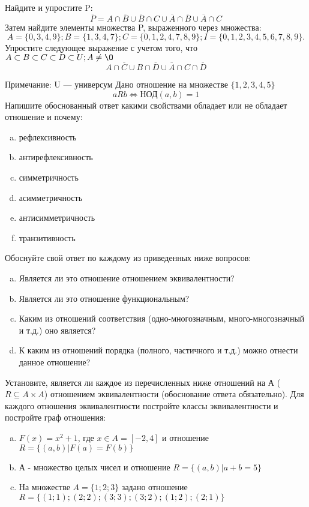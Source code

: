 \documentclass[10pt]{exam}
\begin{document}
\begin{questions}
\question
Найдите и упростите P:
\begin{equation*}
\overline{P} = A \cap \overline{B} \cup \overline{B} \cap C \cup \overline{A} \cap \overline{B} \cup \overline{A} \cap C
\end{equation*}
Затем найдите элементы множества P, выраженного через множества:
\begin{equation*}
A = \{0, 3, 4, 9\}; 
B = \{1, 3, 4, 7\};
C = \{0, 1, 2, 4, 7, 8, 9\};
I = \{0, 1, 2, 3, 4, 5, 6, 7, 8, 9\}.
\end{equation*}\question
Упростите следующее выражение с учетом того, что $A\subset B \subset C \subset D \subset U; A \neq \O$
\begin{equation*}
A \cap  \overline{C} \cup B \cap \overline{D} \cup  \overline{A} \cap C \cap  \overline{D}
\end{equation*}

Примечание: U — универсум\question
Дано отношение на множестве $\{1, 2, 3, 4, 5\}$ 
\begin{equation*}
aRb \iff  \text{НОД}(a,b) =1
\end{equation*}
Напишите обоснованный ответ какими свойствами обладает или не обладает отношение и почему:   
\begin{enumerate} [a)]\setcounter{enumi}{0}
\item рефлексивность
\item антирефлексивность
\item симметричность
\item асимметричность
\item антисимметричность
\item транзитивность
\end{enumerate}

Обоснуйте свой ответ по каждому из приведенных ниже вопросов:
\begin{enumerate} [a)]\setcounter{enumi}{0}
    \item Является ли это отношение отношением эквивалентности?
    \item Является ли это отношение функциональным?
    \item Каким из отношений соответствия (одно-многозначным, много-многозначный и т.д.) оно является?
    \item К каким из отношений порядка (полного, частичного и т.д.) можно отнести данное отношение?
\end{enumerate}


\question
Установите, является ли каждое из перечисленных ниже отношений на А ($R \subseteq A \times A$) отношением эквивалентности (обоснование ответа обязательно). Для каждого отношения эквивалентности постройте классы эквивалентности и постройте граф отношения:
\begin{enumerate} [a)]\setcounter{enumi}{0}
\item $F(x)=x^{2}+1$, где $x \in A = [-2, 4]$ и отношение $R = \{(a,b)|F(a) = F(b)\}$
\item А - множество целых чисел и отношение $R = \{(a,b)|a + b = 5\}$
\item На множестве $A = \{1; 2; 3\}$ задано отношение $R = \{(1; 1); (2; 2); (3; 3); (3; 2); (1; 2); (2; 1)\}$


\end{enumerate}
\end{questions}
\end{document}
